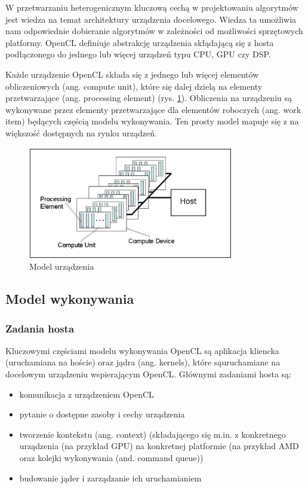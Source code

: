 \documentclass[polish, 12pt]{aghthesis}
\begin{document}
	W przetwarzaniu heterogenicznym kluczową cechą w projektowaniu algorytmów jest wiedza na temat architektury urządzenia docelowego. Wiedza ta umożliwia nam odpowiednie dobieranie algorytmów w zależności od możliwości sprzętowych platformy. OpenCL definiuje abstrakcję urządzenia skłądającą się z hosta podłączonego do jednego lub więcej urządzeń typu CPU, GPU czy DSP.
	
	Każde urządzenie OpenCL składa się z jednego lub więcej elementów obliczeniowych (ang. compute unit), które się dalej dzielą na elementy przetwarzające (ang. processing element) (rys. \ref{fig:model}). Obliczenia na urządzeniu są wykonywane przez elementy przetwarzające dla elementów roboczych (ang. work item) będących częścią modelu wykonywania. Ten prosty model mapuje się z na większość dostępnych na rynku urządzeń.
	
	
	\begin{figure}[h!]
    \centering
    \includegraphics[width=0.8\textwidth]{PlatformModel.jpg}
    \caption{Model urządzenia}
    \label{fig:model}
	\end{figure}
	
	\subsection{Model wykonywania}
	
	\subsubsection{Zadania hosta}
	Kluczowymi częściami modelu wykonywania OpenCL są aplikacja kliencka (uruchamiana na hoście) oraz jądra (ang. kernels), które sąuruchamiane na docelowym urządzeniu wspierającym OpenCL. Głównymi zadaniami hosta są:
	\begin{itemize} 
	\item komunikacja z urządzeniem OpenCL
	\item pytanie o dostępne zasoby i cechy urządzenia
	\item tworzenie kontekstu (ang. context) (składającego się m.in. z konkretnego urządzenia (na przykład GPU) na konkretnej platformie (na przykład AMD oraz kolejki wykonywania (and. command queue))
	\item budowanie jąder i zarządzanie ich uruchamianiem
	\end{itemize}
	
\end{document}
